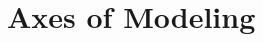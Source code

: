 \begin{comment}
	\pagebreak
\end{comment}

\section{Axes of Modeling}
\begin{comment}
\subsection{Structure}

	\begin{itemize}
	
	\item Problem definition
	\begin{itemize}
	\item Understanding your Problem
	\end{itemize}
	
	\item Choosing a model
	\begin{itemize}
	\item Probabilistic vs. non-probabilistic
	\item Structured Predicition
	\end{itemize}
	
	\item Loss and Evaluation
	\begin{itemize}
	\item Loss Functions
	\item Regularization
	\item Evaluation Metrics
	\end{itemize}	
	
	\item Model Selection
	\begin{itemize}
	\item Importance of Model selection
	\item Significance Testing
	\end{itemize}
	\end{itemize}
\end{comment}

\begin{comment}
	Most problems boil down to find a mapping $f: \cX \rightarrow \cY$.\\
	How is the task characterised? Classification, Structured Prediction, representation learning...\\
	What's the metric of success? How are we optimizing for it?\\
	How do we choose the final f?\\
\end{comment}

